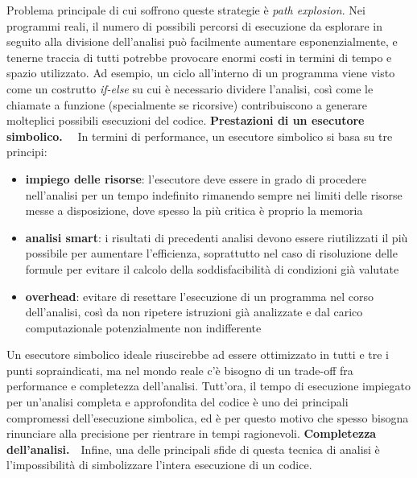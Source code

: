 \documentclass[Lau, oneside]{sapthesis}%
\begin{document}
\newpage
Problema principale di cui soffrono queste strategie è \textit{path explosion}.
\newline
Nei programmi reali, il numero di possibili percorsi di esecuzione da esplorare in seguito alla divisione dell'analisi può facilmente aumentare esponenzialmente, e tenerne traccia di tutti potrebbe provocare enormi costi in termini di tempo e spazio utilizzato.
\newline
Ad esempio, un ciclo all'interno di un programma viene visto come un costrutto \textit{if-else} 
su cui è necessario dividere l'analisi, così come le chiamate a funzione (specialmente se ricorsive) contribuiscono a generare molteplici possibili esecuzioni del codice.
\newline \newline \newline
\textbf{Prestazioni di un esecutore simbolico.} \ \ In termini di performance, un esecutore simbolico si basa su tre principi:
\begin{itemize}
    \item \textbf{impiego delle risorse}: l'esecutore deve essere in grado di procedere nell'analisi per un tempo indefinito rimanendo sempre nei limiti delle risorse messe a disposizione, dove spesso la più critica è proprio la memoria
    \item \textbf{analisi smart}: i risultati di precedenti analisi devono essere riutilizzati il più possibile per aumentare l'efficienza, soprattutto nel caso di risoluzione delle formule per evitare il calcolo della soddisfacibilità di condizioni già valutate
    \item \textbf{overhead}: evitare di resettare l'esecuzione di un programma nel corso dell'analisi, così da non ripetere istruzioni già analizzate e dal carico computazionale potenzialmente non indifferente
\end{itemize}
Un esecutore simbolico ideale riuscirebbe ad essere ottimizzato in tutti e tre i punti sopraindicati, ma nel mondo reale c'è bisogno di un trade-off fra performance e completezza dell'analisi.
\newline
Tutt'ora, il tempo di esecuzione impiegato per un'analisi completa e approfondita del codice è uno dei principali compromessi dell'esecuzione simbolica, ed è per questo motivo che spesso bisogna rinunciare alla precisione per rientrare in tempi ragionevoli.
\newline \newline \newline
\textbf{Completezza dell'analisi.}\ \ Infine, una delle principali sfide di questa tecnica di analisi è l'impossibilità di simbolizzare l'intera esecuzione di un codice.
\end{document}
